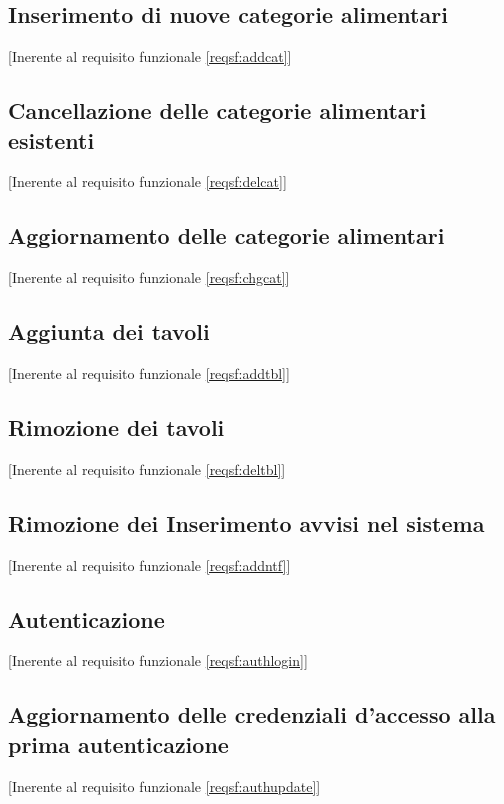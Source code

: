 	\newpage\subsection{Inserimento di nuove categorie alimentari}[Inerente al requisito funzionale \ref{reqsf:addcat}]

	\newpage\subsection{Cancellazione delle categorie alimentari esistenti}[Inerente al requisito funzionale \ref{reqsf:delcat}]

	\newpage\subsection{Aggiornamento delle categorie alimentari}[Inerente al requisito funzionale \ref{reqsf:chgcat}]

	\newpage\subsection{Aggiunta dei tavoli}[Inerente al requisito funzionale \ref{reqsf:addtbl}]

	\newpage\subsection{Rimozione dei tavoli}[Inerente al requisito funzionale \ref{reqsf:deltbl}]

	\newpage\subsection{Rimozione dei Inserimento avvisi nel sistema}[Inerente al requisito funzionale \ref{reqsf:addntf}]

	\newpage\subsection{Autenticazione}[Inerente al requisito funzionale \ref{reqsf:authlogin}]

	\newpage\subsection{Aggiornamento delle credenziali d'accesso alla prima autenticazione}[Inerente al requisito funzionale \ref{reqsf:authupdate}]

